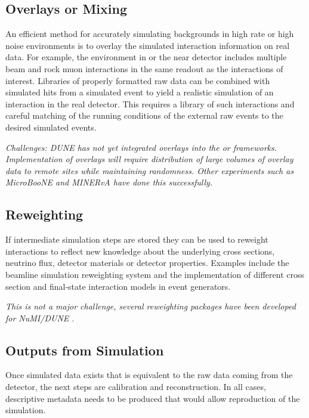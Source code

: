 \documentclass[../main-v1.tex]{subfiles}
\begin{document}
\subsection{Overlays or Mixing}
\label{sec:usecases_overlays}
An efficient method for accurately simulating backgrounds in high rate or high noise environments is to overlay the simulated interaction information on real data.  For example, the environment in  or the near detector includes multiple beam and rock muon interactions in the same readout as %
the interactions of interest.  Libraries of properly formatted raw data can be combined with simulated hits from a simulated event to yield a realistic simulation of an interaction in the real detector. This requires a library of such interactions and careful matching of the running conditions of the external raw events to the desired simulated events. 

{\it Challenges: %
DUNE has not yet integrated overlays into the  or   frameworks. %
Implementation of overlays will  require distribution of large volumes of overlay data to remote sites while maintaining randomness. Other experiments such as MicroBooNE and MINERvA have done this successfully. }

\subsection{Reweighting}
If intermediate simulation steps  are stored they can be used to reweight interactions to reflect new knowledge about the underlying cross sections, neutrino flux, detector materials or detector properties. Examples include the  beamline simulation reweighting system and the implementation of different cross section and final-state interaction models in event generators. 

{\it This is not a major challenge, several reweighting packages have been developed for NuMI/DUNE \cite{Aliaga:2015wva, Calcutt:2021zck}.}

\subsection{Outputs from Simulation}
Once simulated data exists
that is equivalent to the raw data coming from the detector, %
the next steps are calibration and reconstruction. In all cases, descriptive metadata needs to be produced that would allow reproduction of the simulation. 
\end{document}
